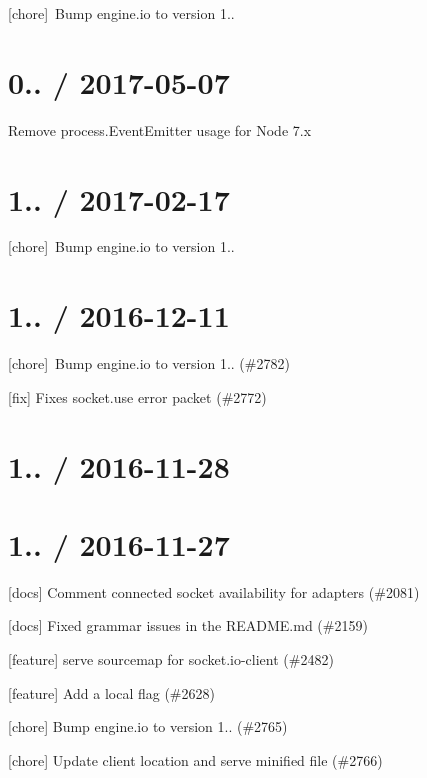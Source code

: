 \begin{DoxyItemize}
\item \mbox{[}chore\mbox{]} \+Bump engine.\+io to version 1..
\end{DoxyItemize}

\section*{0.. / 2017-\/05-\/07 }


\begin{DoxyItemize}
\item Remove process.\+Event\+Emitter usage for Node 7.\+x
\end{DoxyItemize}

\section*{1.. / 2017-\/02-\/17 }


\begin{DoxyItemize}
\item \mbox{[}chore\mbox{]} \+Bump engine.\+io to version 1..
\end{DoxyItemize}

\section*{1.. / 2016-\/12-\/11 }


\begin{DoxyItemize}
\item \mbox{[}chore\mbox{]} \+Bump engine.\+io to version 1.. (\#2782)
\item \mbox{[}fix\mbox{]} Fixes socket.\+use error packet (\#2772)
\end{DoxyItemize}

\section*{1.. / 2016-\/11-\/28 }

\section*{1.. / 2016-\/11-\/27 }


\begin{DoxyItemize}
\item \mbox{[}docs\mbox{]} Comment connected socket availability for adapters (\#2081)
\item \mbox{[}docs\mbox{]} Fixed grammar issues in the R\+E\+A\+D\+M\+E.\+md (\#2159)
\item \mbox{[}feature\mbox{]} serve sourcemap for socket.\+io-\/client (\#2482)
\item \mbox{[}feature\mbox{]} Add a {\ttfamily local} flag (\#2628)
\item \mbox{[}chore\mbox{]} Bump engine.\+io to version 1.. (\#2765)
\item \mbox{[}chore\mbox{]} Update client location and serve minified file (\#2766)
\end{DoxyItemize}

